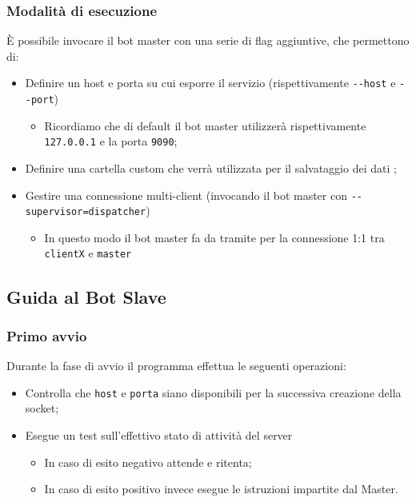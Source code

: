 \documentclass[letterpaper, 11pt]{article}
\begin{document}
\subsubsection{Modalità di esecuzione}
\label{Modalità dispatcher}
È possibile invocare il bot master con una serie di flag aggiuntive, che permettono di:
\begin{itemize}
\item Definire un host e porta su cui esporre il servizio (rispettivamente \texttt{-{}-host} e \texttt{-{}-port})
\begin{itemize}
\item Ricordiamo che di default il bot master utilizzerà rispettivamente \texttt{127.0.0.1} e la porta \texttt{9090};
\end{itemize}
\item Definire una cartella custom che verrà utilizzata per il salvataggio dei dati \autocite{NotaDatiSalvati};
\item Gestire una connessione multi-client (invocando il bot master con \texttt{-{}-supervisor=dispatcher})
\begin{itemize}
\item In questo modo il bot master fa da tramite per la connessione 1:1 tra \texttt{clientX} e \texttt{master}
\end{itemize}
\end{itemize}
\subsection{Guida al Bot Slave}
\label{Guida (Bot Slave)}
\subsubsection{Primo avvio}
\label{Primo avvio (Bot slave)}
Durante la fase di avvio il programma effettua le seguenti operazioni:
\begin{itemize}
\item Controlla che \texttt{host} e \texttt{porta} \autocite{infoHostPortSlave} siano disponibili per la successiva creazione della socket;
\item Esegue un test sull'effettivo stato di attività del server
\begin{itemize}
\item In caso di esito negativo attende e ritenta;
\item In caso di esito positivo invece esegue le istruzioni impartite dal Master.
\end{itemize}
\end{itemize}
\end{document}
